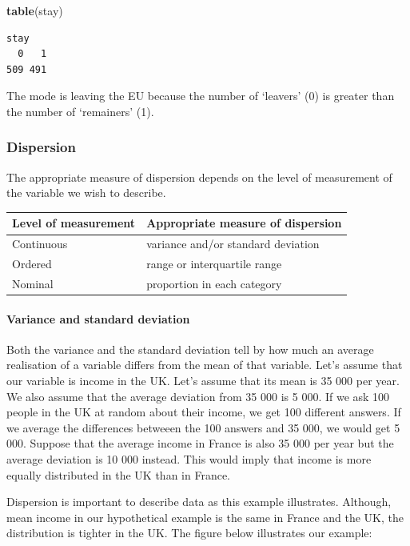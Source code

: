 \documentclass[]{article}
\newenvironment{Shaded}{\begin{snugshade}}{\end{snugshade}}
\newcommand{\KeywordTok}[1]{\textcolor[rgb]{0.13,0.29,0.53}{\textbf{#1}}}
\newcommand{\NormalTok}[1]{#1}
\let\oldparagraph\paragraph
\renewcommand{\paragraph}[1]{\oldparagraph{#1}\mbox{}}
\begin{document}
\begin{Shaded}
\begin{Highlighting}[]
\KeywordTok{table}\NormalTok{(stay)}
\end{Highlighting}
\end{Shaded}

\begin{verbatim}
stay
  0   1 
509 491 
\end{verbatim}

The mode is leaving the EU because the number of `leavers' (0) is greater than the number of `remainers' (1).

\hypertarget{dispersion}{%
\subsubsection{Dispersion}\label{dispersion}}

The appropriate measure of dispersion depends on the level of measurement of the variable we wish to describe.

\begin{longtable}[]{@{}ll@{}}
\toprule
Level of measurement & Appropriate measure of dispersion\tabularnewline
\midrule
\endhead
Continuous & variance and/or standard deviation\tabularnewline
Ordered & range or interquartile range\tabularnewline
Nominal & proportion in each category\tabularnewline
\bottomrule
\end{longtable}

\hypertarget{variance-and-standard-deviation}{%
\paragraph{Variance and standard deviation}\label{variance-and-standard-deviation}}

Both the variance and the standard deviation tell by how much an average realisation of a variable differs from the mean of that variable. Let's assume that our variable is income in the UK. Let's assume that its mean is 35 000 per year. We also assume that the average deviation from 35 000 is 5 000. If we ask 100 people in the UK at random about their income, we get 100 different answers. If we average the differences betweeen the 100 answers and 35 000, we would get 5 000. Suppose that the average income in France is also 35 000 per year but the average deviation is 10 000 instead. This would imply that income is more equally distributed in the UK than in France.

Dispersion is important to describe data as this example illustrates. Although, mean income in our hypothetical example is the same in France and the UK, the distribution is tighter in the UK. The figure below illustrates our example:
\end{document}
